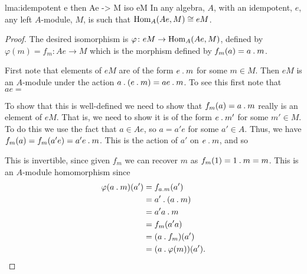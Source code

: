 \begin{lma}{}{lma:idempotent e then Ae -> M iso eM}
    In any algebra, \(A\), with an idempotent, \(e\), any left \(A\)-module, \(M\), is such that \(\operatorname{Hom}_A(Ae, M) \cong eM\).
    \begin{proof}
        The desired isomorphism is \(\varphi \colon eM \to \operatorname{Hom}_A(Ae, M)\), defined by \(\varphi(m) = f_m \colon Ae \to M\) which is the morphism defined by \(f_m(a) = a \mathbin{.} m\).
        
        First note that elements of \(eM\) are of the form \(e \mathbin{.} m\) for some \(m \in M\).
        Then \(eM\) is an \(A\)-module under the action \(a \mathbin{.} (e \mathbin{.} m) = ae \mathbin{.} m\).
        To see this first note that \(ae = \)
        
        To show that this is well-defined we need to show that \(f_m(a) = a \mathbin{.} m\) really is an element of \(eM\).
        That is, we need to show it is of the form \(e \mathbin{.} m'\) for some \(m' \in M\).
        To do this we use the fact that \(a \in Ae\), so \(a = a'e\) for some \(a' \in A\).
        Thus, we have \(f_m(a) = f_m(a'e) = a'e \mathbin{.} m\).
        This is the action of \(a'\) on \(e \mathbin{.} m\), and so 
        
        This is invertible, since given \(f_m\) we can recover \(m\) as \(f_m(1) = 1 \mathbin{.} m = m\).
        This is an \(A\)-module homomorphism since
        \begin{align}
            \varphi(a \mathbin{.} m)(a') &= f_{a \mathbin{.} m}(a')\\
            &= a' \mathbin{.} (a \mathbin{.} m)\\
            &= a'a \mathbin{.} m\\
            &= f_{m}(a'a)\\
            &= (a \mathbin{.} f_m)(a')\\
            &= (a \mathbin{.} \varphi(m))(a').
        \end{align} 
    \end{proof}
\end{lma}

